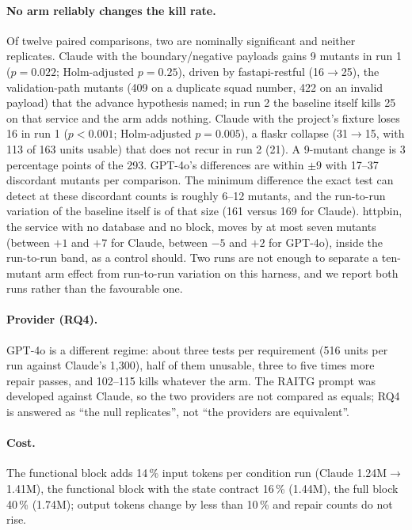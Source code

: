 \documentclass[preprint,12pt]{elsarticle}
\begin{document}
\paragraph{No arm reliably changes the kill rate.} Of twelve paired comparisons, two are nominally significant and neither replicates. Claude with the boundary/negative payloads gains 9 mutants in run 1 ($p=0.022$; Holm-adjusted $p=0.25$), driven by fastapi-restful (16$\to$25), the validation-path mutants (409 on a duplicate squad number, 422 on an invalid payload) that the advance hypothesis named; in run 2 the baseline itself kills 25 on that service and the arm adds nothing. Claude with the project's fixture loses 16 in run 1 ($p<0.001$; Holm-adjusted $p=0.005$), a flaskr collapse (31$\to$15, with 113 of 163 units usable) that does not recur in run 2 (21). A 9-mutant change is 3 percentage points of the 293. GPT-4o's differences are within $\pm 9$ with 17--37 discordant mutants per comparison. The minimum difference the exact test can detect at these discordant counts is roughly 6--12 mutants, and the run-to-run variation of the baseline itself is of that size (161 versus 169 for Claude). httpbin, the service with no database and no block, moves by at most seven mutants (between $+1$ and $+7$ for Claude, between $-5$ and $+2$ for GPT-4o), inside the run-to-run band, as a control should. Two runs are not enough to separate a ten-mutant arm effect from run-to-run variation on this harness, and we report both runs rather than the favourable one.

\paragraph{Provider (RQ4).} GPT-4o is a different regime: about three tests per requirement (516 units per run against Claude's 1,300), half of them unusable, three to five times more repair passes, and 102--115 kills whatever the arm. The RAITG prompt was developed against Claude, so the two providers are not compared as equals; RQ4 is answered as ``the null replicates'', not ``the providers are equivalent''.

\paragraph{Cost.} The functional block adds 14\,\% input tokens per condition run (Claude 1.24M$\to$1.41M), the functional block with the state contract 16\,\% (1.44M), the full block 40\,\% (1.74M); output tokens change by less than 10\,\% and repair counts do not rise.
\end{document}
